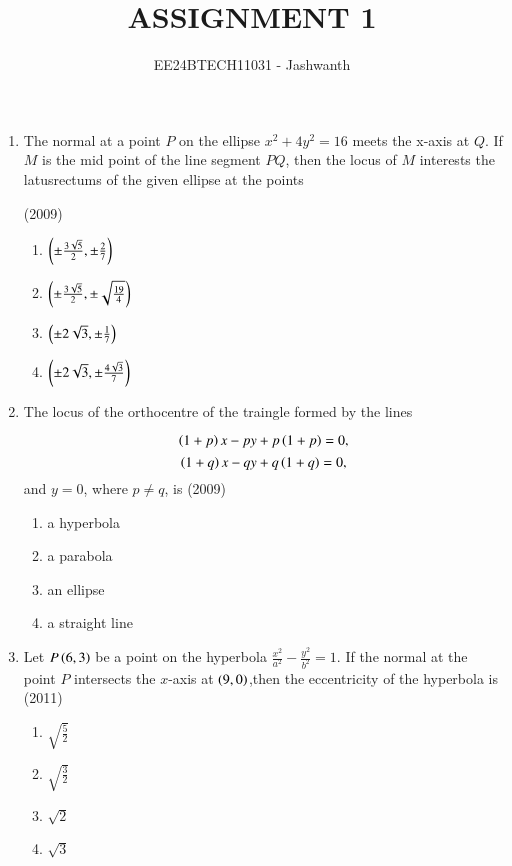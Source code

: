 \documentclass[journal,12pt,onecolumn]{IEEEtran}
\theoremstyle{remark}
\begin{document}

\vspace{3cm}

\title{ASSIGNMENT 1}
\author{EE24BTECH11031 - Jashwanth}
\maketitle

\bigskip

\begin{enumerate}
\item The normal at a point $P$ on the ellipse $x^2 +4y^2=16$ meets the x-axis at $Q$. If $M$ is the mid point of the line segment $PQ$, then the locus of $M$ interests the latusrectums of the given ellipse at the points
	
	\hfill (2009)
		\begin{enumerate}
			\item $\left(\pm\frac{3\sqrt{5}}{2},\pm\frac{2}{7}\right)$
			\item $\left(\pm\frac{3\sqrt{5}}{2},\pm\sqrt{\frac{19}{4}}\right)$
			\item $\left(\pm2\sqrt{3},\pm\frac{1}{7}\right)$
			\item $\left(\pm2\sqrt{3},\pm\frac{4\sqrt{3}}{7}\right)$	
		\end{enumerate}
		
\item The locus of the orthocentre of the traingle formed by the lines
		
			$$\left(1+p\right)x-py+p\left(1+p\right)=0,$$
			$$\left(1+q\right)x-qy+q\left(1+q\right)=0,$$
		and $y=0$, where $p \neq q$, is
		\hfill(2009)
\begin{enumerate}
	\item a hyperbola
	\item a parabola
	\item an ellipse
	\item a straight line
\end{enumerate}

\item Let $P\left(6,3\right)$ be a point on the hyperbola $\frac{x^2}{a^2}-\frac{y^2}{b^2}=1$. If the normal at the point $P$ intersects the $x$-axis at $\left(9,0\right)$,then the eccentricity of the hyperbola is
	\hfill (2011)\\
		\begin{enumerate}
			\item$\sqrt{\frac{5}{2}}$
			\item$\sqrt{\frac{3}{2}}$
			\item$\sqrt{2}$
			\item$\sqrt{3}$
		\end{enumerate}


\end{enumerate}
\end{document}
